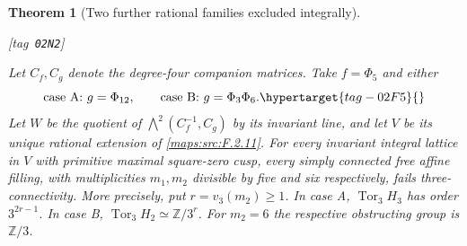 \documentclass[11pt,a4paper]{article}
\numberwithin{equation}{section}
\newtheorem{theorem}{Theorem}[section]
\theoremstyle{definition}
\newcommand{\StatementRecord}[4]{{\upshape\footnotesize[tag~\texttt{#3}]}\enspace\ignorespaces}
\begin{document}
\begin{theorem}[Two further rational families excluded integrally]\hypertarget{tag-02N2}{}\label{maps:src:F.2.13}
\StatementRecord{maps:src:F.2.13}{proved}{02N2}{\cref{maps:src:F.2.11}, \cref{maps:src:F.2.7}, \cref{night:P1.9}, \cref{night:P1.11}; \cite[Tag~09V5, Lemma~20.18.1; Tag~01F2, Lemma~20.13.4]{StacksProject}; \cite[Theorem~3.2, p.~195]{Hatcher2002}}


Let $C_f,C_g$ denote the degree-four companion matrices.
Take $f=\Phi_5$ and either
\begin{equation}
 \text{case A: }g=\Phi_{12},\qquad
 \text{case B: }g=\Phi_3\Phi_6.
 \hypertarget{tag-02F5}{}\label{maps:eq:F.36}
\end{equation}
Let $W$ be the quotient of
$\bigwedge^2(C_f^{-1},C_g)$ by its invariant line, and
let $V$ be its unique rational extension of \ref{maps:src:F.2.11}.
For every invariant integral lattice in $V$ with primitive
maximal square-zero cusp, every simply connected free affine
filling, with multiplicities $m_1,m_2$ divisible by five and
six respectively, fails three-connectivity.
More precisely, put $r=v_3(m_2)\geq1$.
In case A, $\operatorname{Tor}_3 H_3$ has order
$3^{2r-1}$.  In case B,
$\operatorname{Tor}_3 H_2\simeq\mathbb Z/3^r$.
For $m_2=6$ the respective obstructing group is $\mathbb Z/3$.

\end{theorem}
\end{document}
